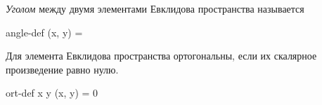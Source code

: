
\begin{definition}
  \textit{Уголом} между двумя элементами Евклидова пространства называется
  \begin{lequation}{angle-def}
    \cos \angle (x, y) = 
  \end{lequation}
\end{definition}

\begin{definition}
  Для элемента Евклидова пространства ортогональны, если их скалярное
  произведение равно нулю.
  \begin{lequation}{ort-def}
    x \bot y \iff (x, y) = 0
  \end{lequation}
\end{definition}

